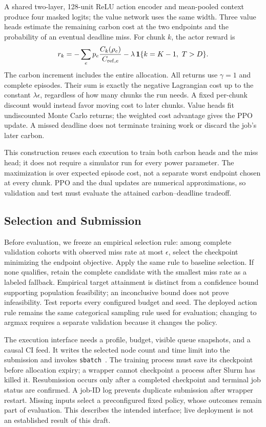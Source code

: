 A shared two-layer, 128-unit ReLU action encoder and mean-pooled context
produce four masked logits; the value network uses the same width.
Three value heads estimate the remaining carbon cost at the two endpoints
and the probability of an eventual deadline miss. For chunk $k$, the actor
reward is
\begin{equation}
 r_k=-\sum_e p_e\frac{C_k(\rho_e)}{C_{{\rm ref},e}}
        -\lambda\,\mathbf1\{k=K-1,\ T>D\}.
 \label{eq:reward}
\end{equation}
The carbon increment includes the entire allocation. All returns use
$\gamma=1$ and complete episodes. Their sum is exactly the negative
Lagrangian cost up to the constant $\lambda\epsilon$, regardless of how many
chunks the run needs. A fixed per-chunk discount would instead favor moving
cost to later chunks. Value heads fit undiscounted Monte Carlo returns;
the weighted cost advantage gives the PPO update. A missed deadline does not
terminate training work or discard the job's later carbon.

This construction reuses each execution to train both carbon heads and the
miss head; it does not require a simulator run for every power parameter.
The maximization is over expected episode cost, not a separate worst endpoint
chosen at every chunk. PPO and the dual updates are numerical approximations,
so validation and test must evaluate the attained carbon--deadline tradeoff.

\subsection{Selection and Submission}
Before evaluation, we freeze an empirical selection rule: among complete
validation cohorts with observed miss rate at most $\epsilon$, select the
checkpoint minimizing the endpoint objective. Apply the same rule to baseline
selection. If none qualifies, retain the complete candidate with the smallest
miss rate as a labeled fallback. Empirical target attainment is distinct from
a confidence bound supporting population feasibility; an inconclusive bound
does not prove infeasibility. Test reports every configured budget and seed.
The deployed action
rule remains the same categorical sampling rule used for evaluation; changing
to argmax requires a separate validation because it changes the policy.

The execution interface needs a profile, budget, visible queue snapshots, and
a causal CI feed. It writes the selected node count and time limit into the
submission and invokes \texttt{sbatch}~\cite{slurmsbatch}. The training process
must save its checkpoint before allocation expiry; a wrapper cannot checkpoint
a process after Slurm has killed it. Resubmission occurs only after a completed
checkpoint and terminal job status are confirmed. A job-ID log prevents duplicate
submission after wrapper restart. Missing inputs select a preconfigured fixed
policy, whose outcomes remain part of evaluation. This describes the intended
interface; live deployment is not an established result of this draft.
